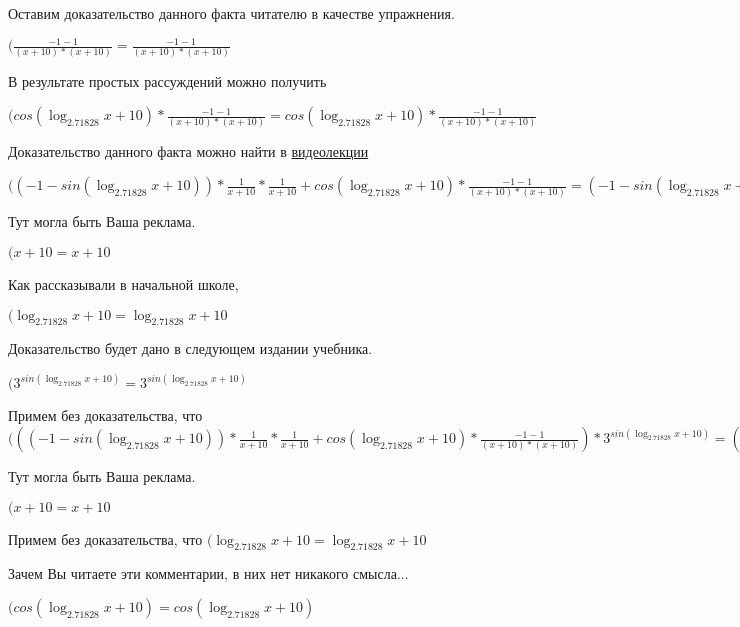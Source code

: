 \documentclass[12pt,a4paper,fleqn]{article}
\theoremstyle{definition}
\begin{document}
Оставим доказательство данного факта читателю в качестве упражнения.

$(\frac{ -1  -  1 }{( x  +  10 ) * ( x  +  10 )}
 = \frac{ -1  -  1 }{( x  +  10 ) * ( x  +  10 )}
$

В результате простых рассуждений можно получить

$(cos(\log_{ 2.71828 }{ x  +  10 }) * \frac{ -1  -  1 }{( x  +  10 ) * ( x  +  10 )}
 = cos(\log_{ 2.71828 }{ x  +  10 }) * \frac{ -1  -  1 }{( x  +  10 ) * ( x  +  10 )}
$

Доказательство данного факта можно найти в \href{https://www.youtube.com/watch?v=dQw4w9WgXcQ}{видеолекции}

$(( -1  - sin(\log_{ 2.71828 }{ x  +  10 })) * \frac{ 1 }{ x  +  10 }
 * \frac{ 1 }{ x  +  10 }
 + cos(\log_{ 2.71828 }{ x  +  10 }) * \frac{ -1  -  1 }{( x  +  10 ) * ( x  +  10 )}
 = ( -1  - sin(\log_{ 2.71828 }{ x  +  10 })) * \frac{ 1 }{ x  +  10 }
 * \frac{ 1 }{ x  +  10 }
 + cos(\log_{ 2.71828 }{ x  +  10 }) * \frac{ -1  -  1 }{( x  +  10 ) * ( x  +  10 )}
$

Тут могла быть Ваша реклама.

$( x  +  10  =  x  +  10 $

Как рассказывали в начальной школе,

$(\log_{ 2.71828 }{ x  +  10 } = \log_{ 2.71828 }{ x  +  10 }$

Доказательство будет дано в следующем издании учебника.

$({ 3 }^{sin(\log_{ 2.71828 }{ x  +  10 })} = { 3 }^{sin(\log_{ 2.71828 }{ x  +  10 })}$

Примем без доказательства, что
$((( -1  - sin(\log_{ 2.71828 }{ x  +  10 })) * \frac{ 1 }{ x  +  10 }
 * \frac{ 1 }{ x  +  10 }
 + cos(\log_{ 2.71828 }{ x  +  10 }) * \frac{ -1  -  1 }{( x  +  10 ) * ( x  +  10 )}
) * { 3 }^{sin(\log_{ 2.71828 }{ x  +  10 })} = (( -1  - sin(\log_{ 2.71828 }{ x  +  10 })) * \frac{ 1 }{ x  +  10 }
 * \frac{ 1 }{ x  +  10 }
 + cos(\log_{ 2.71828 }{ x  +  10 }) * \frac{ -1  -  1 }{( x  +  10 ) * ( x  +  10 )}
) * { 3 }^{sin(\log_{ 2.71828 }{ x  +  10 })}$

Тут могла быть Ваша реклама.

$( x  +  10  =  x  +  10 $

Примем без доказательства, что
$(\log_{ 2.71828 }{ x  +  10 } = \log_{ 2.71828 }{ x  +  10 }$

Зачем Вы читаете эти комментарии, в них нет никакого смысла...

$(cos(\log_{ 2.71828 }{ x  +  10 }) = cos(\log_{ 2.71828 }{ x  +  10 })$
\end{document}
